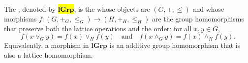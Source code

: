 \begin{definition} \label{definition:category_of_lattice_ordered_groups}
    The , denoted by \hl{$\mathbf{lGrp}$}, is the   whose objects are  $(G, +, \leq)$ and whose morphisms $f : (G, +_G, \leq_G) \to (H, +_H, \leq_H)$ are the group homomorphisms that preserve both the lattice operations and the order: for all $x, y \in G$,
    $$f(x \vee_G y) = f(x) \vee_H f(y) \quad \text{and} \quad f(x \wedge_G y) = f(x) \wedge_H f(y).$$
    Equivalently, a morphism in $\mathbf{lGrp}$ is an additive group homomorphism that is also a lattice homomorphism.
\end{definition}
